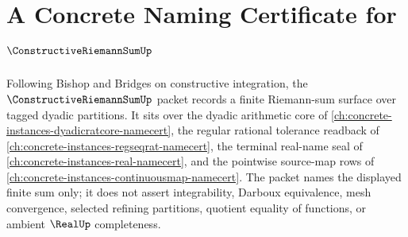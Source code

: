 \chapter{A Concrete Naming Certificate for $\ConstructiveRiemannSumUp$}
\label{ch:concrete-instances-constructive-riemann-sum-namecert}

Following Bishop and Bridges on constructive integration, the $\ConstructiveRiemannSumUp$ packet records a finite Riemann-sum surface over tagged dyadic partitions. It sits over the dyadic arithmetic core of \autoref{ch:concrete-instances-dyadicratcore-namecert}, the regular rational tolerance readback of \autoref{ch:concrete-instances-regseqrat-namecert}, the terminal real-name seal of \autoref{ch:concrete-instances-real-namecert}, and the pointwise source-map rows of \autoref{ch:concrete-instances-continuousmap-namecert}. The packet names the displayed finite sum only; it does not assert integrability, Darboux equivalence, mesh convergence, selected refining partitions, quotient equality of functions, or ambient $\RealUp$ completeness.

